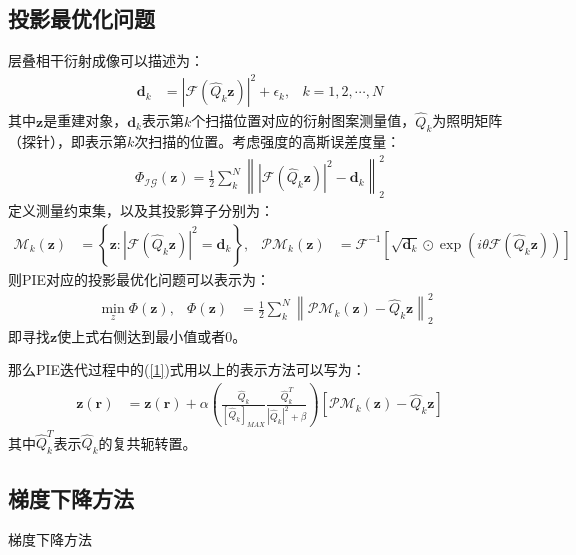 \documentclass[10pt,aspectratio=169]{beamer} %
\renewcommand{\vec}[1]{\boldsymbol{#1}} %
\begin{document}
\subsection{投影最优化问题}

\begin{frame}[allowframebreaks]
    层叠相干衍射成像可以描述为：
    \begin{align*}
        \vec{d}_k & =|\mathcal{F} (\hat{Q}_k \vec{z})|^2+\epsilon_k, & k=1,2,\cdots ,N
    \end{align*}
    其中$\vec{z}$是重建对象，$\vec{d}_k$表示第$k$个扫描位置对应的衍射图案测量值，$\hat{Q}_k$为照明矩阵（探针），即表示第$k$次扫描的位置。考虑强度的高斯误差度量：
    \begin{align*}
        \Phi _{\mathcal{IG}}(\vec{z})=\frac{1}{2}\sum_k^N \left\lVert |\mathcal{F}(\hat{Q}_k \vec{z})|^2 -\vec{d}_k \right\rVert _2^2
    \end{align*}
    定义测量约束集，以及其投影算子分别为：
    \begin{align}
        \mathcal{M}_k (\vec{z}) & =\left\{\vec{z} : |\mathcal{F}(\hat{Q}_k \vec{z})|^2=\vec{d}_k\right\}, & \mathcal{PM}_k (\vec{z}) & =\mathcal{F}^{-1} \left[\sqrt{\vec{d}_k}\odot \exp{(i \theta \mathcal{F}(\hat{Q}_k \vec{z}))}\right] \label{2.0}
    \end{align}
    则PIE对应的投影最优化问题可以表示为：
    \begin{align}
         & \min \limits_z \Phi (\vec{z}), & \Phi (\vec{z}) & =\frac{1}{2}\sum_k^N \left\lVert \mathcal{PM}_k(\vec{z})-\hat{Q}_k \vec{z} \right\rVert _2^2 \label{2}
    \end{align}
    即寻找$\vec{z}$使上式右侧达到最小值或者0。
    
    那么PIE迭代过程中的(\ref{1})式用以上的表示方法可以写为：
    \begin{align}
        \vec{z}(\vec{r}) & =\vec{z}(\vec{r})+\alpha \left(\frac{\hat{Q}_k}{[\hat{Q}_k]_{MAX}} \frac{\hat{Q}_k^T}{|\hat{Q}_k|^2+\beta}\right)[\mathcal{PM}_k(\vec{z})-\hat{Q}_k \vec{z}] \label{3}
    \end{align}
    其中$\hat{Q}_k^T$表示$\hat{Q}_k$的复共轭转置。
\end{frame}

\subsection{梯度下降方法}

\begin{frame}
    \begin{algorithm}[H]
        \LinesNumbered
        \caption{\small 梯度下降方法}
        \label{A1}
    \end{algorithm}
\end{frame}
\end{document}
